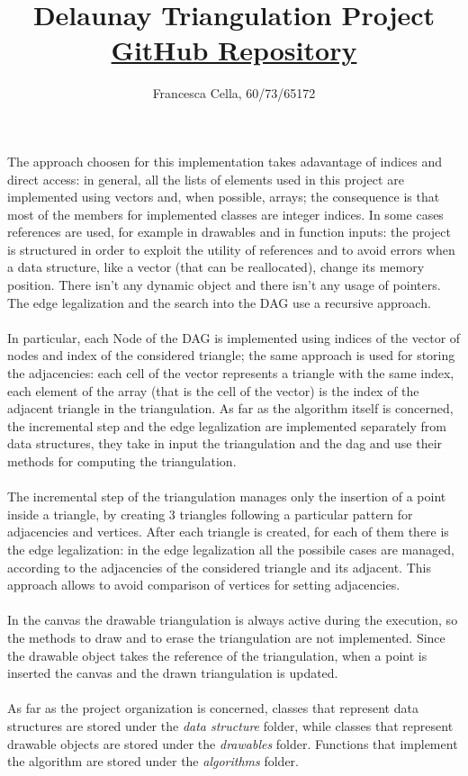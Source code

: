 \documentclass[12pt]{article}
\title{Delaunay Triangulation Project\\\href{https://github.com/UNICAAS2/as2-project-Frac7}{\small{GitHub Repository}}}
\author{Francesca Cella, 60/73/65172}
\date{}
\begin{document}
\maketitle

The approach choosen for this implementation takes adavantage of indices and direct access: in general, all the lists of elements used in this project are implemented using vectors and, when possible, arrays; the consequence is that most of the members for implemented classes are integer indices. In some cases references are used, for example in drawables and in function inputs: the project is structured in order to exploit the utility of references and to avoid errors when a data structure, like a vector (that can be reallocated), change its memory position. There isn’t any dynamic object and there isn’t any usage of pointers. The edge legalization and the search into the DAG use a recursive approach.\\\\
In particular, each Node of the DAG is implemented using indices of the vector of nodes and index of the considered triangle; the same approach is used for storing the adjacencies: each cell of the vector represents a triangle with the same index, each element of the array (that is the cell of the vector) is the index of the adjacent triangle in the triangulation.
As far as the algorithm itself is concerned, the incremental step and the edge legalization are implemented separately from data structures, they take in input the triangulation and the dag and use their methods for computing the triangulation.\\\\
The incremental step of the triangulation manages only the insertion of a point inside a triangle, by creating 3 triangles following a particular pattern for adjacencies and vertices. After each triangle is created, for each of them there is the edge legalization: in the edge legalization all the possibile cases are managed, according to the adjacencies of the considered triangle and its adjacent. This approach allows to avoid comparison of vertices for setting adjacencies.\\\\
In the canvas the drawable triangulation is always active during the execution, so the methods to draw and to erase the triangulation are not implemented. Since the drawable object takes the reference of the triangulation, when a point is inserted the canvas and the drawn triangulation is updated.\\\\
As far as the project organization is concerned, classes that represent data structures are stored under the \textit{data structure} folder, while classes that represent drawable objects are stored under the \textit{drawables} folder. Functions that implement the algorithm are stored under the \textit{algorithms} folder.
\end{document}

